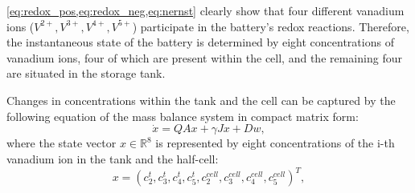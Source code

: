 \cref{eq:redox_pos,eq:redox_neg,eq:nernst} clearly show that four different vanadium ions ($V^{2+},V^{3+},V^{4+},V^{5+}$) participate in the battery's redox reactions. Therefore, the instantaneous state of the battery is determined by eight concentrations of vanadium ions, four of which are present within the cell, and the remaining four are situated in the storage tank.

Changes in concentrations within the tank and the cell \autocite{pugach_zero_2018} can be captured by the following equation of the mass balance system in compact matrix form:
\begin{equation}
    \label{eq:mb_dyn}
        \dot{x} = QAx+ \gamma Jx+Dw,
\end{equation}
where the state vector $x \in \mathbb{R}^{8}$ is represented by eight concentrations of the i-th vanadium ion in the tank and the half-cell:
\begin{equation}
    \label{eq:conc_state}
        x = {\left({c_2^{t},c_3^{t},c_4^{t},c_5^{t},c_2^{cell},c_3^{cell},c_4^{cell},c_5^{cell}}\right)}^T,
\end{equation}

